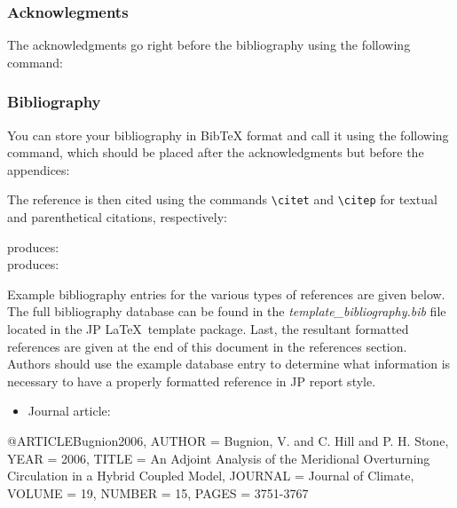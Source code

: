 \documentclass[12pt,fleqn]{article}
\let\oldverbatim\verbatim
\let\oldendverbatim\endverbatim
\renewenvironment{verbatim}{\endgraf\footnotesize\singlespace\oldverbatim}{\oldendverbatim\endsinglespace}
\begin{document}
\subsubsection{Acknowlegments}

The acknowledgments go right before the bibliography using the following command:
\begin{verbatim}
\acknowledgments{}
\end{verbatim}

\subsubsection{Bibliography}

You can store your bibliography in BibTeX format and call it using the 
following command, which should be placed after the acknowledgments but before 
the appendices:
\begin{verbatim}

\end{verbatim}

The reference is then cited using the commands {\footnotesize\verb|\citet|} and 
{\footnotesize\verb|\citep|} for textual and parenthetical citations, 
respectively:

\bigskip

 produces: \citet{Reilly2007}\\
 produces: \citep{Webster2003}

\bigskip

Example bibliography entries for the various types of references are given 
below. The full bibliography database can be found in the 
\textit{template\_bibliography.bib} file located in the JP \LaTeX\, template 
package. Last, the resultant formatted references are given at the end of this 
document in the references section. Authors should use the example database 
entry to determine what information is necessary to have a properly formatted 
reference in JP report style. 

\begin{itemize}
\item Journal article:
\end{itemize}
\begin{verbatim}
@ARTICLE{Bugnion2006,
  AUTHOR = {Bugnion, V. and C. Hill and P. H. Stone},
  YEAR = {2006},
  TITLE = {An Adjoint Analysis of the Meridional Overturning Circulation in a
  Hybrid Coupled Model},
  JOURNAL = {Journal of Climate},
  VOLUME = {19},
  NUMBER = {15},
  PAGES = {3751-3767}}
\end{verbatim}
\end{document}
